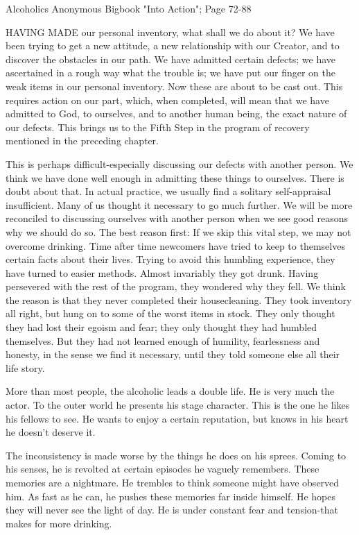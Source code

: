 
Alcoholics Anonymous Bigbook "Into Action"; Page 72-88

\begin{biblechapter}

HAVING MADE our personal inventory, what shall we do about it?  We have been trying to get a new attitude, a new relationship with our Creator, and to discover the obstacles in our path.  We have admitted certain defects; we have ascertained in a rough way what the trouble is; we have put our finger on the weak items in our personal inventory.  Now these are about to be cast out.  This requires action on our part, which, when completed, will mean that we have admitted to God, to ourselves, and to another human being, the exact nature of our defects.  This brings us to the Fifth Step in the program of recovery mentioned in the preceding chapter.

This is perhaps difficult-especially discussing our defects with another person.  We think we have done well enough in admitting these things to ourselves.  There is doubt about that.  In actual practice, we usually find a solitary self-appraisal insufficient.  Many of us thought it necessary to go much further.  We will be more reconciled to discussing ourselves with another person when we see good reasons why we should do so.  The best reason first: If we skip this vital step, we may not overcome drinking.  Time after time newcomers have tried to keep to themselves certain facts about their lives.  Trying to avoid this humbling experience, they have turned to easier methods.  Almost invariably they got drunk.  Having persevered with the rest of the program, they wondered why they fell.  We think the reason is that they never completed their housecleaning.  They took inventory all right, but hung on to some of the worst items in stock.  They only thought they had lost their egoism and fear; they only thought they had humbled themselves.  But they had not learned enough of humility, fearlessness and honesty, in the sense we find it necessary, until they told someone else all their life story.

More than most people, the alcoholic leads a double life.  He is very much the actor.  To the outer world he presents his stage character.  This is the one he likes his fellows to see.  He wants to enjoy a certain reputation, but knows in his heart he doesn't deserve it.

The inconsistency is made worse by the things he does on his sprees.  Coming to his senses, he is revolted at certain episodes he vaguely remembers.  These memories are a nightmare.  He trembles to think someone might have observed him.  As fast as he can, he pushes these memories far inside himself.  He hopes they will never see the light of day.  He is under constant fear and tension-that makes for more drinking.


\end{biblechapter}
